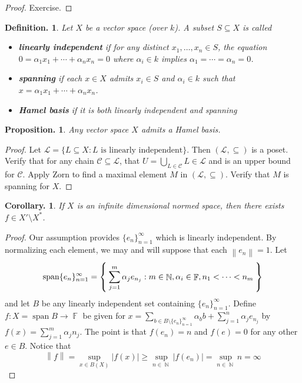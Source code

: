 \documentclass[11pt, a4paper]{memoir}
\DeclareMathOperator{\N}{{\mathbb{N}}}
\DeclareMathOperator{\F}{{\mathbb{F}}}
\newcommand{\norm}[1]{\ensuremath{\left\lVert#1\right\rVert}}
\theoremstyle{change}
\newtheorem{corollary}[theorem]{Corollary.}
\newtheorem{proposition}[theorem]{Proposition.}
\theoremstyle{plain}
\theoremstyle{nonumberplain}
\newtheorem{definition}{Definition.}
\newtheorem{proof}{Proof}
\DeclareMathOperator{\spn}{span}
\numberwithin{equation}{section}
\begin{document}
\begin{proof}
    Exercise.
\end{proof}
\begin{definition}
    Let $X$ be a vector space (over $k$).
    A subset $S\subseteq X$ is called
    \begin{itemize}[nl]
        \item \textbf{linearly independent} if for any distinct $x_1,\ldots,x_n\in S$, the equation $0=\alpha_1x_1+\cdots+\alpha_nx_n=0$ where $\alpha_i\in k$ implies $\alpha_1=\cdots=\alpha_n=0$.
        \item \textbf{spanning} if each $x\in X$ admits $x_i\in S$ and $\alpha_i\in k$ such that $x=\alpha_1x_1+\cdots+\alpha_nx_n$.
        \item \textbf{Hamel basis} if it is both linearly independent and spanning
    \end{itemize}
\end{definition}
\begin{proposition}
    Any vector space $X$ admits a Hamel basis.
\end{proposition}
\begin{proof}
    Let $\mathcal{L}=\{L\subseteq X:L\text{ is linearly independent}\}$.
    Then $(\mathcal{L},\subseteq)$ is a poset.
    Verify that for any chain $\mathcal{C}\subseteq\mathcal{L}$, that $U=\bigcup_{L\in\mathcal{C}}L\in\mathcal{L}$ and is an upper bound for $\mathcal{C}$.
    Apply Zorn to find a maximal element $M$ in $(\mathcal{L},\subseteq)$.
    Verify that $M$ is spanning for $X$.
\end{proof}
\begin{corollary}
    If $X$ is an infinite dimensional normed space, then there exists $f\in X'\setminus X^*$.
\end{corollary}
\begin{proof}
    Our assumption provides $\{e_n\}_{n=1}^\infty$ which is linearly independent.
    By normalizing each element, we may and will suppose that each $\norm{e_n}=1$.
    Let
    \begin{equation*}
        \spn\{e_n\}_{n=1}^\infty=\Set{\sum_{j=1}^m\alpha_je_{n_j}:m\in\N,\alpha_i\in\F, n_1<\cdots<n_m}
    \end{equation*}
    and let $B$ be any linearly independent set containing $\{e_n\}_{n=1}^\infty$.
    Define $f:X=\spn B\to\F$ be given for $x=\sum_{b\in B\setminus\{e_n\}_{n=1}^\infty}\alpha_b b+\sum_{j=1}^n\alpha_je_{n_j}$ by $f(x)=\sum_{j=1}^m\alpha_j n_j$.
    The point is that $f(e_n)=n$ and $f(e)=0$ for any other $e\in B$.
    Notice that
    \begin{equation*}
        \norm{f}=\sup_{x\in B(X)}|f(x)|\geq\sup_{n\in\N}|f(e_n)|=\sup_{n\in\N}n=\infty
    \end{equation*}
\end{proof}
\end{document}
